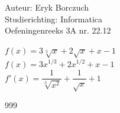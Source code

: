 \documentclass[a4paper]{article}
\begin{document}
  
\noindent \large Auteur: Eryk Borczuch \\
\noindent \large Studierichting: Informatica\\
\noindent \large Oefeningenreeks 3A nr. 22.12\\

\medskip

\normalsize

$f(x) = 3 \sqrt[3]{x} + 2\sqrt{x}+x-1$\\

$f(x) = 3 x^{1/3}+2x^{1/2}+x-1$\\

$f'(x) = \dfrac{1}{\sqrt[3]{x^2}}+\dfrac{1}{\sqrt{x}}+1$

\begin{thebibliography}{999}
\end{thebibliography}
\end{document}
